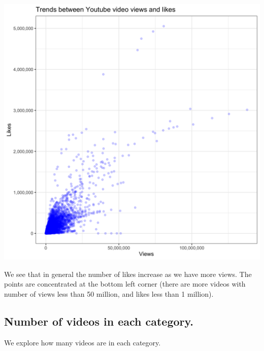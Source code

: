 \documentclass[]{article}
\begin{document}
\includegraphics{../images/views_likes.png}

We see that in general the number of likes increase as we have more
views. The points are concentrated at the bottom left corner (there are
more videos with number of views less than 50 million, and likes less
than 1 million).

\hypertarget{number-of-videos-in-each-category.}{%
\subsection{Number of videos in each
category.}\label{number-of-videos-in-each-category.}}

We explore how many videos are in each category.
\end{document}
